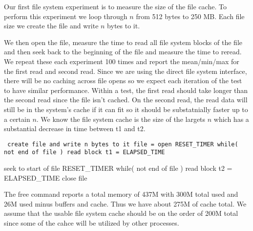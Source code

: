 Our first file system experiment is to measure the size of the file cache.
To perform this experiment we loop through $n$ from 512 bytes to 250 MB.
Each file size we create the file and write $n$ bytes to it.

We then open the file, measure the time to read all file system blocks of the file and then seek back to the beginning of the file and measure the time to reread.
We repeat these each experiment 100 times and report the mean/min/max for the first read and second read.
Since we are using the direct file system interface, there will be no caching across file opens so we expect each iteration of the test to have similar performance.
Within a test, the first read should take longer than the second read since the file isn't cached.
On the second read, the read data will still be in the system's cache if it can fit so it should be substatnially faster up to a certain $n$.
We know the file system cache is the size of the largets $n$ which has a substantial decrease in time between t1 and t2.

{\tt
  create file and write n bytes to it
  file = open
  RESET\_TIMER
  while( not end of file )
    read block
  t1 = ELAPSED\_TIME
  
  seek to start of file
  RESET\_TIMER
  while( not end of file )
    read block
  t2 = ELAPSED\_TIME    
  close file
}

The free command reports a total memory of 437M with 300M total used and 26M used minus buffers and cache.
Thus we have about 275M of cache total.
We assume that the usable file system cache should be on the order of 200M total since some of the cahce will be utilized by other processes.

